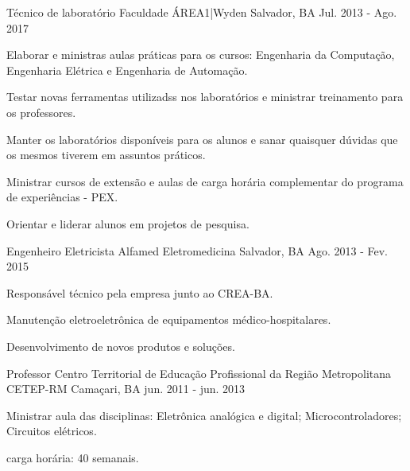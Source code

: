 \begin{cventries}
  \cventry
    {Técnico de laboratório} %
    {Faculdade ÁREA1|Wyden} %
    {Salvador, BA} %
    {Jul. 2013 - Ago. 2017} %
    {
      \begin{cvitems} %
        \item {Elaborar e ministras aulas práticas para os cursos: Engenharia da Computação, Engenharia Elétrica e Engenharia de Automação.}
        \item {Testar novas ferramentas utilizadss nos laboratórios e ministrar treinamento para os professores.}
        \item {Manter os laboratórios disponíveis para os alunos e sanar quaisquer dúvidas que os mesmos tiverem em assuntos práticos.}
        \item { Ministrar cursos de extensão e aulas de carga horária complementar do programa de experiências - PEX.}
        \item {Orientar e liderar alunos em projetos de pesquisa.}
      \end{cvitems}
    }

  \cventry
    {Engenheiro Eletricista} %
    {Alfamed Eletromedicina} %
    {Salvador, BA} %
    {Ago. 2013 - Fev. 2015} %
    {
      \begin{cvitems} %
        \item {Responsável técnico pela empresa junto ao CREA-BA.}
        \item {Manutenção eletroeletrônica de equipamentos médico-hospitalares.}
        \item {Desenvolvimento de novos produtos e soluções.}
      \end{cvitems}
    }
    

  \cventry
    {Professor} %
    {Centro Territorial de Educação Profissional da Região Metropolitana CETEP-RM} %
    {Camaçari, BA} %
    {jun. 2011 - jun. 2013} %
    {
      \begin{cvitems} %
        \item {Ministrar aula das disciplinas: Eletrônica analógica e digital; Microcontroladores; Circuitos elétricos.}
        \item {carga horária: 40 semanais.}
      \end{cvitems}
    }
    

\end{cventries}
